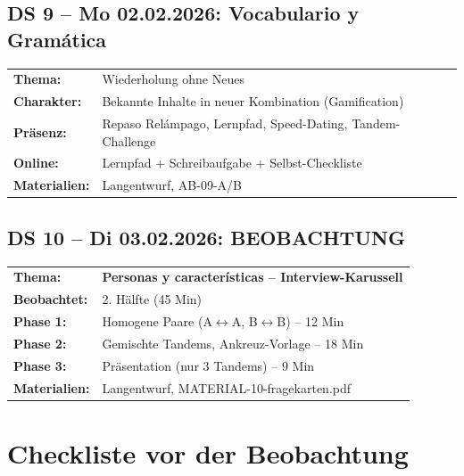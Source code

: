 \documentclass[11pt, a4paper]{article}
\begin{document}
\vspace{0.5cm}

\subsection*{DS 9 -- Mo 02.02.2026: Vocabulario y Gramática}

\begin{tabular}{ll}
\textbf{Thema:} & Wiederholung ohne Neues \\
\textbf{Charakter:} & Bekannte Inhalte in neuer Kombination (Gamification) \\
\textbf{Präsenz:} & Repaso Relámpago, Lernpfad, Speed-Dating, Tandem-Challenge \\
\textbf{Online:} & Lernpfad + Schreibaufgabe + Selbst-Checkliste \\
\textbf{Materialien:} & Langentwurf, AB-09-A/B \\
\end{tabular}

\vspace{0.5cm}

\subsection*{DS 10 -- Di 03.02.2026: BEOBACHTUNG}

\begin{tabular}{ll}
\textbf{Thema:} & \textbf{Personas y características -- Interview-Karussell} \\
\textbf{Beobachtet:} & 2. Hälfte (45 Min) \\
\textbf{Phase 1:} & Homogene Paare (A$\leftrightarrow$A, B$\leftrightarrow$B) -- 12 Min \\
\textbf{Phase 2:} & Gemischte Tandems, Ankreuz-Vorlage -- 18 Min \\
\textbf{Phase 3:} & Präsentation (nur 3 Tandems) -- 9 Min \\
\textbf{Materialien:} & Langentwurf, MATERIAL-10-fragekarten.pdf \\
\end{tabular}

\newpage


\section*{Checkliste vor der Beobachtung}
\end{document}
